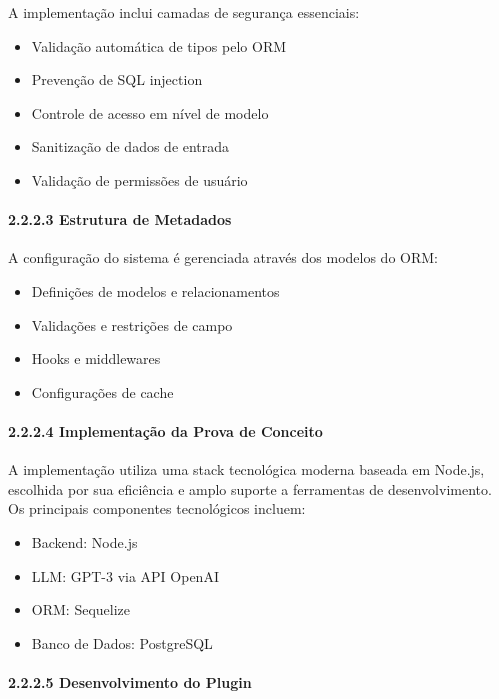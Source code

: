 \documentclass[
]{article}
\providecommand{\tightlist}{%
  \setlength{\itemsep}{0pt}\setlength{\parskip}{0pt}}
\begin{document}
A implementação inclui camadas de segurança essenciais:

\begin{itemize}
\tightlist
\item
  Validação automática de tipos pelo ORM
\item
  Prevenção de SQL injection
\item
  Controle de acesso em nível de modelo
\item
  Sanitização de dados de entrada
\item
  Validação de permissões de usuário
\end{itemize}

\paragraph{2.2.2.3 Estrutura de Metadados}\label{estrutura-de-metadados}

A configuração do sistema é gerenciada através dos modelos do ORM:

\begin{itemize}
\tightlist
\item
  Definições de modelos e relacionamentos
\item
  Validações e restrições de campo
\item
  Hooks e middlewares
\item
  Configurações de cache
\end{itemize}

\paragraph{2.2.2.4 Implementação da Prova de
Conceito}\label{implementauxe7uxe3o-da-prova-de-conceito}

A implementação utiliza uma stack tecnológica moderna baseada em
Node.js, escolhida por sua eficiência e amplo suporte a ferramentas de
desenvolvimento. Os principais componentes tecnológicos incluem:

\begin{itemize}
\tightlist
\item
  Backend: Node.js
\item
  LLM: GPT-3 via API OpenAI
\item
  ORM: Sequelize
\item
  Banco de Dados: PostgreSQL
\end{itemize}

\paragraph{2.2.2.5 Desenvolvimento do
Plugin}\label{desenvolvimento-do-plugin}
\end{document}
